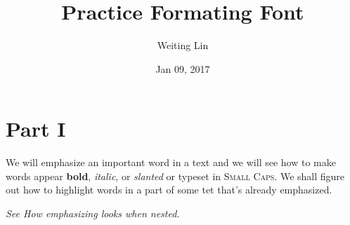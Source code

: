 \documentclass{article}
\title{Practice Formating Font}
\author{Weiting Lin}
\date{Jan 09, 2017}
\begin{document}
\maketitle
\section{Part I}
We will emphasize an important word in a text and we will see
how to make words appear \textbf{bold}, \textit{italic}, or \textsl{slanted} or typeset in \textsc{Small Caps}.
We shall figure out how to highlight words in a part of some tet that's already emphasized.

\emph{See How \emph{emphasizing} looks when nested.}
\end{document}

